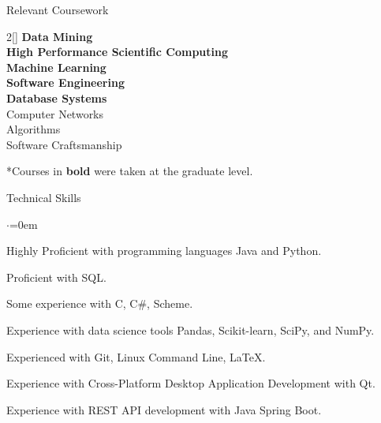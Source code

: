 \documentclass{resume} %
\begin{document}

\begin{rSection}{Relevant Coursework}
\begin{multicols}{2}[]
\textbf{Data Mining} \\
\textbf{High Performance Scientific Computing} \\
\textbf{Machine Learning} \\
\textbf{Software Engineering} \\ 
\textbf{Database Systems} \\
Computer Networks \\
Algorithms \\
Software Craftsmanship
\end{multicols}
\vspace{-1.0em}
*Courses in \textbf{bold} were taken at the graduate level.
\end{rSection}



\begin{rSection}{Technical Skills}
\begin{list}{$\cdot$}{\leftmargin=0em}
\item Highly Proficient with programming languages Java and Python.
\vspace{-0.5em}
\item Proficient with SQL.
\vspace{-0.5em}
\item Some experience with C, C\#, Scheme.
\vspace{-0.5em}
\item Experience with data science tools Pandas, Scikit-learn, SciPy, and NumPy.
\vspace{-0.5em}
\item Experienced with Git, Linux Command Line, LaTeX.
\vspace{-0.5em}
\item Experience with Cross-Platform Desktop Application Development with Qt.
\vspace{-0.5em}
\item Experience with REST API development with Java Spring Boot.
\vspace{-0.5em}
\end{list}
\end{rSection}
\end{document}
